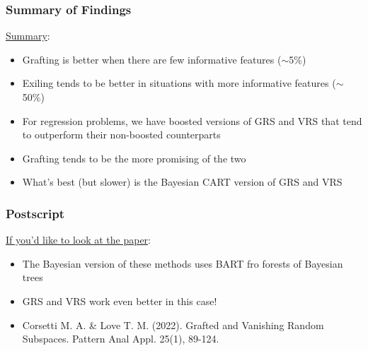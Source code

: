 \documentclass{beamer}
\begin{document}

\begin{frame}

    \frametitle{Summary of Findings}

    \underline{Summary}:
    \medskip
    \begin{itemize}
        \item Grafting is better when there are few informative features ($\sim$5\%)
        \item Exiling tends to be better in situations with more informative 
              features ($\sim$50\%)
        \item For regression problems, we have boosted versions of GRS and VRS that tend to outperform their
              non-boosted counterparts
        \item Grafting tends to be the more promising of the two
\item What's best (but slower) is the Bayesian CART version of GRS and VRS
    \end{itemize}

\end{frame}

\begin{frame}

    \frametitle{Postscript}

    \underline{If you'd like to look at the paper}:
    \medskip
    \begin{itemize}
        \item The Bayesian version of these methods uses BART fro forests of Bayesian trees
      \item GRS and VRS work even better in this case!
      \item Corsetti M. A. \&  Love T. M. (2022).
Grafted and Vanishing Random Subspaces.
Pattern Anal Appl. 25(1), 89-124.
    \end{itemize}

\end{frame}
    
\end{document}
